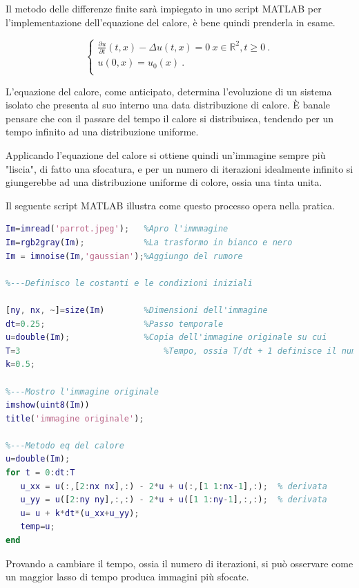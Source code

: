 \raggedright

Il metodo delle differenze finite sarà impiegato in uno script MATLAB per l'implementazione dell'equazione del calore, è bene quindi prenderla in esame.

\begin{equation} 
\begin{cases}

\frac{\partial u}{\partial t}(t,x)-\Delta u(t,x) = 0 \ x \in \mathbb R^2, t\ge 0 \ .\\ 

u(0,x) = u_0(x)\ . \\

\end{cases}
\end{equation}

L'equazione del calore, come anticipato, determina l'evoluzione di un sistema isolato che presenta al suo interno una data distribuzione di calore. \`E banale pensare che con il passare del tempo il calore si distribuisca, tendendo per un tempo infinito ad una distribuzione uniforme.

\vspace{1em}

Applicando l'equazione del calore si ottiene quindi un'immagine sempre più "liscia", di fatto una sfocatura, e per un numero di iterazioni idealmente infinito si giungerebbe ad una distribuzione uniforme di colore, ossia una tinta unita.

\vspace{1em}

Il seguente script MATLAB illustra come questo processo opera nella pratica.

\begin{lstlisting}[language=MATLAB]
Im=imread('parrot.jpeg');   %Apro l'immmagine
Im=rgb2gray(Im);            %La trasformo in bianco e nero
Im = imnoise(Im,'gaussian');%Aggiungo del rumore

%---Definisco le costanti e le condizioni iniziali

[ny, nx, ~]=size(Im)        %Dimensioni dell'immagine
dt=0.25;                    %Passo temporale
u=double(Im);               %Copia dell'immagine originale su cui                                lavorare
T=3			                    %Tempo, ossia T/dt + 1 definisce il numero                            di iterazioni da eseguire
k=0.5;

%---Mostro l'immagine originale
imshow(uint8(Im))
title('immagine originale'); 

%---Metodo eq del calore
u=double(Im);
for t = 0:dt:T
   u_xx = u(:,[2:nx nx],:) - 2*u + u(:,[1 1:nx-1],:);  % derivata                                                           seconda lungo x
   u_yy = u([2:ny ny],:,:) - 2*u + u([1 1:ny-1],:,:);  % derivata                                                            seconda lungo y
   u= u + k*dt*(u_xx+u_yy);
   temp=u;
end

\end{lstlisting}
\newpage
Provando a cambiare il tempo, ossia il numero di iterazioni, si può osservare come un maggior lasso di tempo produca immagini più sfocate.

